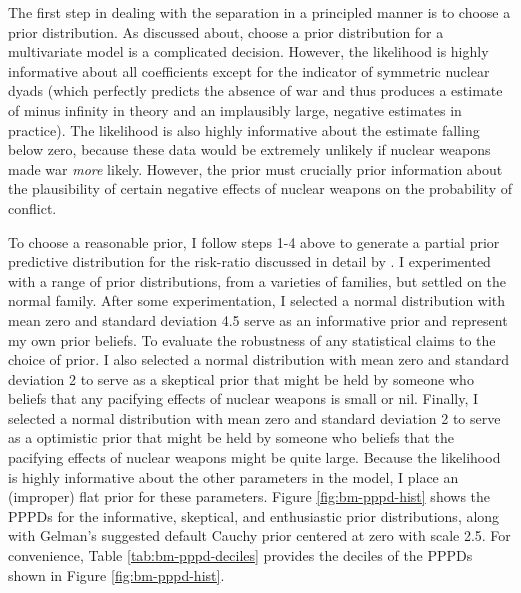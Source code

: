 \documentclass[12pt]{article}
\begin{document}
The first step in dealing with the separation in a principled manner is to choose a prior distribution. As discussed about, choose a prior distribution for a multivariate model is a complicated decision. However, the likelihood is highly informative about all coefficients except for the indicator of symmetric nuclear dyads (which perfectly predicts the absence of war and thus produces a estimate of minus infinity in theory and an implausibly large, negative estimates in practice). The likelihood is also highly informative about the estimate falling below zero, because these data would be extremely unlikely if nuclear weapons made war \emph{more} likely. However, the prior must crucially prior information about the plausibility of certain negative effects of nuclear weapons on the probability of conflict. 

To choose a reasonable prior, I follow steps 1-4 above to generate a partial prior predictive distribution for the risk-ratio discussed in detail by \cite{BellMiller2014}. I experimented with a range of prior distributions, from a varieties of families, but settled on the normal family. After some experimentation, I selected a normal distribution with mean zero and standard deviation 4.5 serve as an informative prior and represent my own prior beliefs. To evaluate the robustness of any statistical claims to the choice of prior. I also selected a normal distribution with mean zero and standard deviation 2 to serve as a skeptical prior that might be held by someone who beliefs that any pacifying effects of nuclear weapons is small or nil. Finally, I selected a normal distribution with mean zero and standard deviation 2 to serve as a optimistic prior that might be held by someone who beliefs that the pacifying effects of nuclear weapons might be quite large. Because the likelihood is highly informative about the other parameters in the model, I place an (improper) flat prior for these parameters. Figure \ref{fig:bm-pppd-hist} shows the PPPDs for the informative, skeptical, and enthusiastic prior distributions, along with Gelman's suggested default Cauchy prior centered at zero with scale 2.5. For convenience, Table \ref{tab:bm-pppd-deciles} provides the deciles of the PPPDs shown in Figure \ref{fig:bm-pppd-hist}. 
\end{document}

